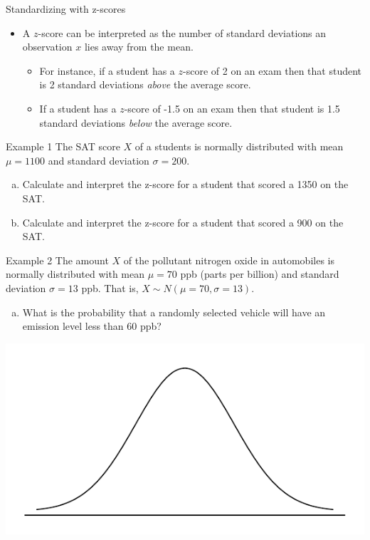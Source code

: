 \documentclass{beamer}
\begin{document}
\begin{frame}{Standardizing with z-scores}
\begin{itemize}
\item A $z$-score can be interpreted as the number of standard deviations an observation $x$ lies away from the mean.
\vspace{5pt}
\begin{itemize}
\item For instance, if a student has a $z$-score of 2 on an exam then that student is 2 standard deviations \emph{above} the average score.
\vspace{5pt}
\item If a student has a $z$-score of -1.5 on an exam then that student is 1.5 standard deviations \emph{below} the average score.
\end{itemize}
\end{itemize}
\end{frame}

\begin{frame}{Example 1}
The SAT score $X$ of a students is normally distributed with mean $\mu=1100$ and standard deviation $\sigma = 200$. 
\begin{enumerate}[(a)]
\item Calculate and interpret the z-score for a student that scored a 1350 on the SAT.
\vspace{2.25cm}
\item Calculate and interpret the z-score for a student that scored a 900 on the SAT.
\vspace{2.25cm}
\end{enumerate}
\end{frame}

\begin{frame}{Example 2}
\vspace{-1.75cm}
\small
The amount $X$ of the pollutant nitrogen oxide in automobiles is normally distributed with mean $\mu=70$ ppb (parts per billion) and standard deviation $\sigma = 13$ ppb.  That is, $X \sim N(\mu = 70, \sigma = 13)$.
\begin{enumerate}[(a)]
\item What is the probability that a randomly selected vehicle will have an emission level less than 60 ppb?
\end{enumerate}
\includegraphics[scale=0.5]{figure/norm_draw.pdf}
\end{frame}
\end{document}
